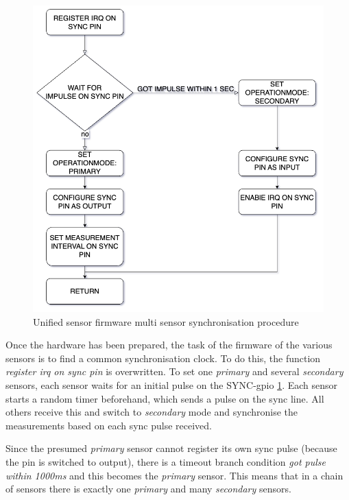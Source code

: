 \begin{figure}
\centering
\includegraphics{./generated_images/border_Unified_sensor_firmware_multi_sensor_synchronisation_procedure.png}
\caption{Unified sensor firmware multi sensor synchronisation procedure
\label{Unified_sensor_firmware_multi_sensor_synchronisation_procedure.png}}
\end{figure}

Once the hardware has been prepared, the task of the firmware of the
various sensors is to find a common synchronisation clock. To do this,
the function \emph{register irq on sync pin} is overwritten. To set one
\emph{primary} and several \emph{secondary} sensors, each sensor waits
for an initial pulse on the SYNC-\gls{gpio}
\ref{Unified_sensor_firmware_multi_sensor_synchronisation_procedure.png}.
Each sensor starts a random timer beforehand, which sends a pulse on the
sync line. All others receive this and switch to \emph{secondary} mode
and synchronise the measurements based on each sync pulse received.

Since the presumed \emph{primary} sensor cannot register its own sync
pulse (because the pin is switched to output), there is a timeout branch
condition \emph{got pulse within 1000ms} and this becomes the
\emph{primary} sensor. This means that in a chain of sensors there is
exactly one \emph{primary} and many \emph{secondary} sensors.

